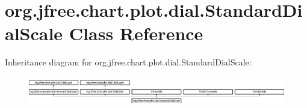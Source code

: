 \hypertarget{classorg_1_1jfree_1_1chart_1_1plot_1_1dial_1_1_standard_dial_scale}{}\section{org.\+jfree.\+chart.\+plot.\+dial.\+Standard\+Dial\+Scale Class Reference}
\label{classorg_1_1jfree_1_1chart_1_1plot_1_1dial_1_1_standard_dial_scale}
Inheritance diagram for org.\+jfree.\+chart.\+plot.\+dial.\+Standard\+Dial\+Scale\+:\begin{figure}[H]
\begin{center}
\leavevmode
\includegraphics[height=1.297297cm]{classorg_1_1jfree_1_1chart_1_1plot_1_1dial_1_1_standard_dial_scale}
\end{center}
\end{figure}
